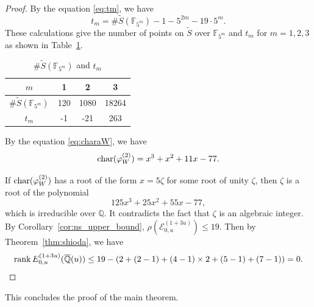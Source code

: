 \documentclass[main]{subfiles}
\begin{document}
\begin{proof}
    By the equation \eqref{eq:tm}, we have
    \begin{equation*}
        t_{m} = \# \tilde{S}(\mathbb{F}_{5^{m}}) - 1 - 5^{2m} - 19 \cdot 5^{m}.
    \end{equation*}
    These calculations give the number of points on $\tilde{S}$ over $\mathbb{F}_{5^{m}}$ and $t_{m}$ for $m=1,2,3$ as shown in Table~\ref{tab:tm}.
    \begin{table}[H]
        \centering
        \caption{$\# \tilde{S}(\mathbb{F}_{5^{m}})$ and $t_{m}$}
        \begin{tabular}{|c|c|c|c|}
            \hline
            $m$                              & 1   & 2    & 3     \\
            \hline
            $\# \tilde{S}(\mathbb{F}_{5^m})$ & 120 & 1080 & 18264 \\
            \hline
            $t_m$                            & -1  & -21  & 263   \\
            \hline
        \end{tabular}
        \label{tab:tm}
    \end{table}

    By the equation \eqref{eq:charaW}, we have
    \begin{equation*}
        \operatorname{char}(\varphi_{W}^{(2)}) = x^{3} + x^{2} + 11 x - 77.
    \end{equation*}

    If $\operatorname{char} (\varphi_{W}^{(2)})$ has a root of the form $x=5 \zeta$ for some root of unity $\zeta$, then $\zeta$ is a root of the polynomial
    \begin{equation*}
        125x^{3} + 25x^{2} + 55 x - 77,
    \end{equation*}
    which is irreducible over $\mathbb{Q}$.
    It contradicts the fact that $\zeta$ is an algebraic integer.
    By Corollary~\ref{cor:ns_upper_bound}, $\rho(\mathcal{E}_{0,u}^{(1 + 3u)}) \leq 19$.
    Then by Theorem~\ref{thm:shioda}, we have
    \begin{equation*}
        \operatorname{rank} E_{0,u}^{(1 + 3u)}(\overline{\mathbb{Q}}(u)) \leq 19 - (2 + (2 - 1) + (4 - 1) \times 2 + (5 - 1) + (7 - 1)) = 0.
    \end{equation*}
\end{proof}

This concludes the proof of the main theorem.
\end{document}
